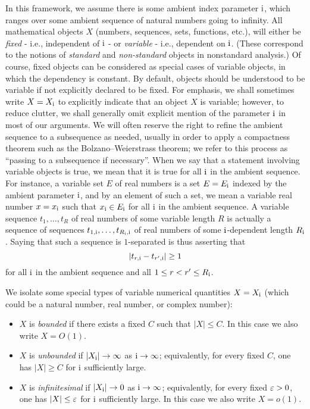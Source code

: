 In this framework, we assume there is some ambient index parameter ${\mathrm{i}}$, which ranges over some ambient sequence of natural numbers going to infinity.  All mathematical objects $X$ (numbers, sequences, sets, functions, etc.), will either be \emph{fixed} - i.e., independent of ${\mathrm{i}}$ - or \emph{variable} - i.e., dependent on ${\mathrm{i}}$.  (These correspond to the notions of \emph{standard} and \emph{non-standard} objects in nonstandard analysis.)  Of course, fixed objects can be considered as special cases of variable objects, in which the dependency is constant.  By default, objects should be understood to be variable if not explicitly declared to be fixed. For emphasis, we shall sometimes write $X = X_{{\mathrm{i}}}$ to explicitly indicate that an object $X$ is variable; however, to reduce clutter, we shall generally omit explicit mention of the parameter ${\mathrm{i}}$ in most of our arguments. We will often reserve the right to refine the ambient sequence to a subsequence as needed, usually in order to apply a compactness theorem such as the Bolzano--Weierstrass theorem; we refer to this process as ``passing to a subsequence if necessary''.  When we say that a statement involving variable objects is true, we mean that it is true for all ${\mathrm{i}}$ in the ambient sequence.
For instance, a variable set $E$ of real numbers is a set $E = E_{{\mathrm{i}}}$ indexed by the ambient parameter ${\mathrm{i}}$, and by an element of such a set, we mean a variable real number $x = x_{{\mathrm{i}}}$ such that $x_{{\mathrm{i}}} \in E_{{\mathrm{i}}}$ for all ${\mathrm{i}}$ in the ambient sequence.  A variable sequence $t_1,\dots,t_R$ of real numbers of some variable length $R$ is actually a sequence of sequences $t_{1,{\mathrm{i}}},\dots,t_{R_{{\mathrm{i}}}, {\mathrm{i}}}$ of real numbers of some ${\mathrm{i}}$-dependent length $R_{{\mathrm{i}}}$.  Saying that such a sequence is $1$-separated is thus asserting that
$$ |t_{r, {\mathrm{i}}} - t_{r', {\mathrm{i}}}| \geq 1$$
for all ${\mathrm{i}}$ in the ambient sequence and all $1 \leq r < r' \leq R_{{\mathrm{i}}}$.

We isolate some special types of variable numerical quantities $X = X_{{\mathrm{i}}}$ (which could be a natural number, real number, or complex number):
\begin{itemize}
\item $X$ is \emph{bounded} if there exists a fixed $C$ such that $|X| \leq C$. In this case we also write $X = O(1)$.
\item $X$ is \emph{unbounded} if $|X_{{\mathrm{i}}}| \to \infty$ as ${\mathrm{i}} \to \infty$; equivalently, for every fixed $C$, one has $|X| \geq C$ for ${\mathrm{i}}$ sufficiently large.
\item $X$ is \emph{infinitesimal} if $|X_{{\mathrm{i}}}| \to 0$ as ${\mathrm{i}} \to \infty$; equivalently, for every fixed $\varepsilon>0$, one has $|X| \leq \varepsilon$ for ${\mathrm{i}}$ sufficiently large. In this case we also write $X = o(1)$.
\end{itemize}

